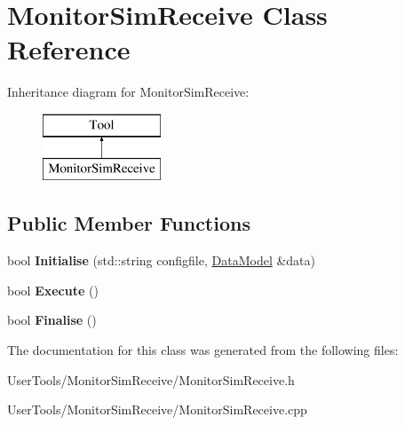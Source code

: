 \hypertarget{classMonitorSimReceive}{\section{Monitor\-Sim\-Receive Class Reference}
\label{classMonitorSimReceive}
}
Inheritance diagram for Monitor\-Sim\-Receive\-:\begin{figure}[H]
\begin{center}
\leavevmode
\includegraphics[height=2.000000cm]{classMonitorSimReceive}
\end{center}
\end{figure}
\subsection*{Public Member Functions}
\begin{DoxyCompactItemize}
\item 
\hypertarget{classMonitorSimReceive_a3e841c945c5481d97fc82cb4658bdaee}{bool {\bfseries Initialise} (std\-::string configfile, \hyperlink{classDataModel}{Data\-Model} \&data)}\label{classMonitorSimReceive_a3e841c945c5481d97fc82cb4658bdaee}

\item 
\hypertarget{classMonitorSimReceive_a289c3a6508deff086d9250263cc9981e}{bool {\bfseries Execute} ()}\label{classMonitorSimReceive_a289c3a6508deff086d9250263cc9981e}

\item 
\hypertarget{classMonitorSimReceive_afb3fd0f4191c888966b83a0bc8ff032d}{bool {\bfseries Finalise} ()}\label{classMonitorSimReceive_afb3fd0f4191c888966b83a0bc8ff032d}

\end{DoxyCompactItemize}


The documentation for this class was generated from the following files\-:\begin{DoxyCompactItemize}
\item 
User\-Tools/\-Monitor\-Sim\-Receive/Monitor\-Sim\-Receive.\-h\item 
User\-Tools/\-Monitor\-Sim\-Receive/Monitor\-Sim\-Receive.\-cpp\end{DoxyCompactItemize}
